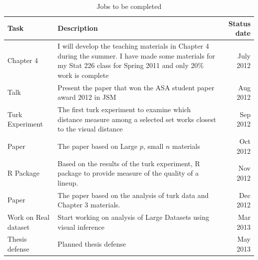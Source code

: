 \begin{table}[hbtp]
\caption{Jobs to be completed}
\centering 
\begin{tabular}{|l|p{10cm}|r|} 
\hline
Task &  Description & Status date\\ %
\hline
Chapter 4 & I will develop the teaching materials in Chapter 4 during the summer. I have made some materials for my Stat 226 class for Spring 2011 and only 20\% work is complete\vspace{.1in} & July 2012 \\
Talk & Present the paper that won the ASA student paper award 2012 in JSM \vspace{.1in} & Aug 2012\\
Turk Experiment & The first turk experiment to examine which distance measure among a selected set works closest to the visual distance  \vspace{.1in}& Sep 2012 \\
Paper & The paper based on Large $p$, small $n$ materials \vspace{.1in} & Oct 2012 \\
R Package  & Based on the results of the turk experiment, R package to provide measure of the quality of a lineup.  \vspace{.1in} & Nov 2012\\
Paper & The paper based on the analysis of turk data and Chapter 3 materials. \vspace{.1in} & Dec 2012\\
Work on Real dataset & Start working on analysis of Large Datasets using visual inference \vspace{.1in}  & Mar 2013\\ 
Thesis defense & Planned thesis defense \vspace{.1in} & May 2013\\
\hline 
\end{tabular}
\label{tbl:tjob}
\end{table}	


